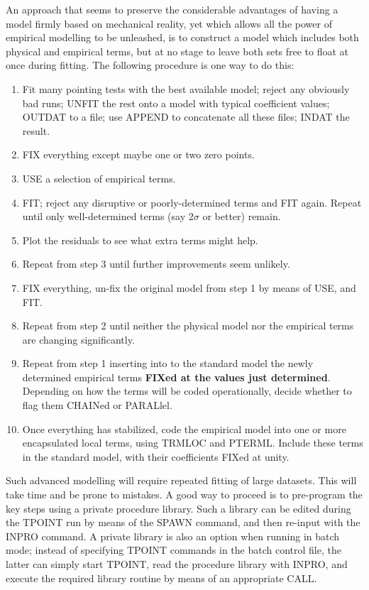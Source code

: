 An approach that seems to preserve the considerable advantages
of having a model firmly based on mechanical reality, yet which
allows all the power of empirical modelling to be unleashed, is
to construct a model which includes both
physical and empirical terms, but at no stage to
leave both sets free to float at once during fitting.  The
following procedure is one way to do this:
\begin{enumerate}
\item Fit many pointing tests with the best available model;
reject any obviously bad runs; UNFIT the rest onto a
model with typical coefficient values;  OUTDAT to a file;
use APPEND to concatenate all these files;  INDAT the
result.
\item FIX everything except maybe one or two zero points.
\item USE a selection of empirical terms.
\item FIT; reject any disruptive or poorly-determined terms and FIT again.
Repeat until only well-determined terms (say $2\sigma$ or better) remain.
\item Plot the residuals to see what extra terms might help.
\item Repeat from step 3 until further improvements seem unlikely.
\item FIX everything, un-fix the original model from step 1
by means of USE, and FIT.
\item Repeat from step 2 until neither the physical model nor the
empirical terms are changing significantly.
\item Repeat from step 1 inserting into to the standard model the
newly determined empirical terms {\bf FIXed at the values just
determined}.  Depending on how the terms will be coded
operationally, decide whether to flag them CHAINed or PARALlel.
\item Once everything has stabilized, code the empirical model
into one or more encapsulated local terms, using TRMLOC and
PTERML.  Include these terms in the standard model, with
their coefficients FIXed at unity.
\end{enumerate}

Such advanced modelling will require repeated fitting of large
datasets.  This will take time and be prone to mistakes.  A good way
to proceed is to pre-program the
key steps using a private procedure library.
Such a library can be edited during the TPOINT run by means of the
SPAWN command, and then re-input with the INPRO command.  A
private library is also an option when running in batch mode;
instead of specifying TPOINT commands in the batch control
file, the latter can simply start TPOINT, read the procedure
library with INPRO, and execute the required library routine by
means of an appropriate CALL.

